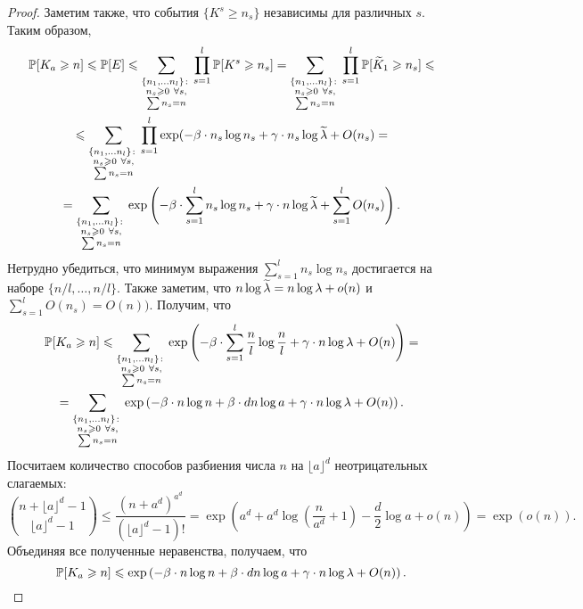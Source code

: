 \begin{proof}
Заметим также, что события $\{K^s \geq n_s\}$ независимы для различных $s$.\\
Таким образом,
\begin{multline*}
    \mathbb{P}[K_a\geqslant n] \leqslant
    \mathbb{P}[E] \leqslant 
    \sum_{\substack{\{n_1, \ldots n_l\}\colon\\ n_s \geqslant 0\ \forall s,\\ \sum n_s = n}}\prod_{s=1}^l\mathbb{P}[K^s\geqslant n_s] =
    \sum_{\substack{\{n_1, \ldots n_l\}\colon\\ n_s \geqslant 0\ \forall s,\\ \sum n_s = n}}\prod_{s=1}^l\mathbb{P}[\widetilde K_1\geqslant n_s]\leqslant \\
    \leqslant \sum_{\substack{\{n_1, \ldots n_l\}\colon\\ n_s \geqslant 0\ \forall s,\\ \sum n_s = n}}\prod_{s=1}^l \exp(-\beta\cdot n_s\log n_s + \gamma\cdot n_s\log\widetilde\lambda + O(n_s) =\\
    =\sum_{\substack{\{n_1, \ldots n_l\}\colon\\ n_s \geqslant 0\ \forall s,\\ \sum n_s = n}}\exp\left(-\beta\cdot \sum_{s=1}^l n_s\log n_s + \gamma\cdot n\log\widetilde\lambda + \sum_{s=1}^l O(n_s)\right).
    \end{multline*}
Нетрудно убедиться, что минимум выражения $\sum_{s=1}^l n_s\log n_s$ достигается на наборе $\{n/l, \ldots, n/l\}$. Также заметим, что $n\log\widetilde\lambda = n\log\lambda + o(n)$ и $\sum_{s=1}^lO(n_s) = O(n))$. Получим, что
    \begin{multline*}
    \mathbb{P}[K_a\geqslant n]\leqslant
    \sum_{\substack{\{n_1, \ldots n_l\}\colon\\ n_s \geqslant 0\ \forall s,\\ \sum n_s = n}}\exp\left(-\beta\cdot \sum_{s=1}^l \dfrac{n}{l}\log\dfrac{n}{l} + \gamma\cdot n\log\lambda + O(n)\right) = \\
    =\sum_{\substack{\{n_1, \ldots n_l\}\colon\\ n_s \geqslant 0\ \forall s,\\ \sum n_s = n}}\exp\left(-\beta\cdot n\log n + \beta\cdot dn\log a + \gamma\cdot n\log\lambda + O(n)\right).
    \end{multline*}
Посчитаем количество способов разбиения числа $n$ на $\lfloor a\rfloor^d$ неотрицательных слагаемых:
\begin{equation*}
    \binom{n + \lfloor a\rfloor^d - 1}{\lfloor a\rfloor^d - 1} \leq \dfrac{(n + a^d)^{a^d}}{(\lfloor a\rfloor^d -1)!} = \exp\left(a^d + a^d\log\left(\dfrac{n}{a^d}+1\right) - \dfrac{d}{2} \log a + o(n)\right) = \exp(o(n)).
\end{equation*}{}
Объединяя все полученные неравенства, получаем, что 
\begin{equation*}
    \mathbb{P}[K_a\geqslant n]\leqslant
    \exp\left(-\beta\cdot n\log n + \beta\cdot dn\log a + \gamma\cdot n\log\lambda + O(n) \right).
\end{equation*}{}
\end{proof}{}

